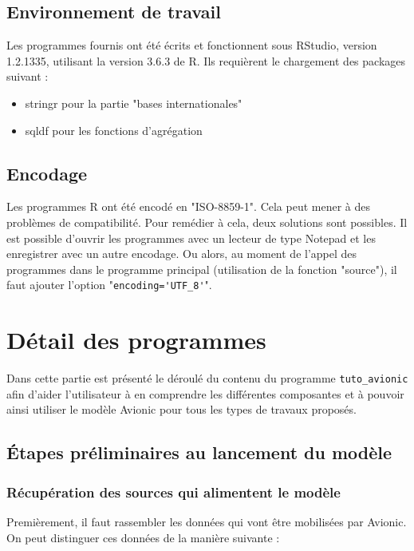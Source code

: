 \documentclass[a4paper,french,11pt]{article}
\begin{document}
\subsection{Environnement de travail}

Les programmes fournis ont \'et\'e \'ecrits et fonctionnent sous RStudio, version 1.2.1335, utilisant la version 3.6.3 de R. Ils requi\`erent le chargement des packages suivant :
\begin{itemize}
    \item stringr pour la partie "bases internationales"
    \item sqldf pour les fonctions d'agr\'egation
\end{itemize}


\subsection{Encodage}

Les programmes R ont \'et\'e encod\'e en "ISO-8859-1". Cela peut mener \`a des probl\`emes de compatibilit\'e. Pour rem\'edier \`a cela, deux solutions sont possibles. Il est possible d'ouvrir les programmes avec un lecteur de type Notepad et les enregistrer avec un autre encodage. Ou alors, au moment de l'appel des programmes dans le programme principal (utilisation de la fonction "source"), il faut ajouter l'option "\verb|encoding='UTF_8'|".



\section{D\'etail des programmes}

Dans cette partie est pr\'esent\'e le d\'eroul\'e du contenu du programme \verb|tuto_avionic| afin d'aider l'utilisateur \`a en comprendre les diff\'erentes composantes et \`a pouvoir ainsi utiliser le mod\`ele Avionic pour tous les types de travaux propos\'es.

\subsection{\'Etapes pr\'eliminaires au lancement du mod\`ele}

\subsubsection{R\'ecup\'eration des sources qui alimentent le mod\`ele}

Premi\`erement, il faut rassembler les donn\'ees qui vont \^etre mobilis\'ees par Avionic. On peut distinguer ces donn\'ees de la mani\`ere suivante : 
\end{document}
